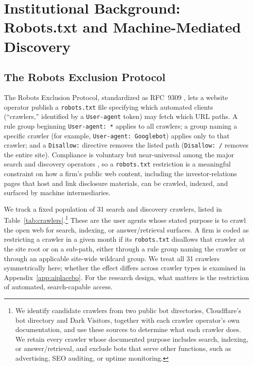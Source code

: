 \documentclass[12pt]{article}
\begin{document}
\section{Institutional Background: Robots.txt and Machine-Mediated Discovery}\label{sec:bg}

\subsection{The Robots Exclusion Protocol}\label{sec:bg_rfc}
The Robots Exclusion Protocol, standardized as RFC~9309 \citep{RFC9309}, lets a website operator publish a \texttt{robots.txt} file specifying which automated clients (``crawlers,'' identified by a \texttt{User-agent} token) may fetch which URL paths. A rule group beginning \texttt{User-agent: *} applies to all crawlers; a group naming a specific crawler (for example, \texttt{User-agent: Googlebot}) applies only to that crawler; and a \texttt{Disallow:} directive removes the listed path (\texttt{Disallow: /} removes the entire site). Compliance is voluntary but near-universal among the major search and discovery operators \citep{CuiEtAl2025,LiuEtAl2025}, so a \texttt{robots.txt} restriction is a meaningful constraint on how a firm's public web content, including the investor-relations pages that host and link disclosure materials, can be crawled, indexed, and surfaced by machine intermediaries.

We track a fixed population of 31 search and discovery crawlers, listed in Table~\ref{tab:crawlers}.\footnote{We identify candidate crawlers from two public bot directories, Cloudflare's bot directory and Dark Visitors, together with each crawler operator's own documentation, and use these sources to determine what each crawler does. We retain every crawler whose documented purpose includes search, indexing, or answer/retrieval, and exclude bots that serve other functions, such as advertising, SEO auditing, or uptime monitoring.} These are the user agents whose stated purpose is to crawl the open web for search, indexing, or answer/retrieval surfaces. A firm is coded as restricting a crawler in a given month if its \texttt{robots.txt} disallows that crawler at the site root or on a sub-path, either through a rule group naming the crawler or through an applicable site-wide wildcard group. We treat all 31 crawlers symmetrically here; whether the effect differs across crawler types is examined in Appendix~\ref{app:aiplacebo}. For the research design, what matters is the restriction of automated, search-capable access.
\end{document}
